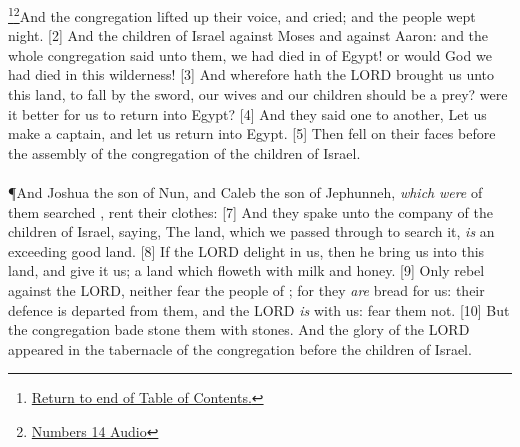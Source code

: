 \footnote{\textcolor[cmyk]{0.99998,1,0,0}{\hyperlink{TOC}{Return to end of Table of Contents.}}}\footnote{\href{https://audiobible.com/bible/numbers_14.html}{\textcolor[cmyk]{0.99998,1,0,0}{Numbers 14 Audio}}}\textcolor[cmyk]{0.99998,1,0,0}{And  the congregation lifted up their voice, and cried; and the people wept   night.}
[2] \textcolor[cmyk]{0.99998,1,0,0}{And  the children of Israel  against Moses and against Aaron: and the whole congregation said unto them,    we had died in  of Egypt! or would God we had died in this wilderness!}
[3] \textcolor[cmyk]{0.99998,1,0,0}{And wherefore hath the LORD brought us unto this land, to fall by the sword,   our wives and our children should be a prey? were it  better for us to return into Egypt?}
[4] \textcolor[cmyk]{0.99998,1,0,0}{And they said one to another, Let us make a captain, and let us return into Egypt.}
[5] \textcolor[cmyk]{0.99998,1,0,0}{Then  fell on their faces before  the assembly of the congregation of the children of Israel.}\\
\\
\P \textcolor[cmyk]{0.99998,1,0,0}{And Joshua the son of Nun, and Caleb the son of Jephunneh, \emph{which} \emph{were} of them   searched , rent their clothes:}
[7] \textcolor[cmyk]{0.99998,1,0,0}{And they spake unto  the company of the children of Israel, saying, The land, which we passed through to search it, \emph{is} an exceeding good land.}
[8] \textcolor[cmyk]{0.99998,1,0,0}{If the LORD delight in us, then he  bring us into this land, and give it us; a land which floweth with milk and honey.}
[9] \textcolor[cmyk]{0.99998,1,0,0}{Only rebel   against the LORD, neither fear  the people of ; for they \emph{are} bread for us: their defence is departed from them, and the LORD \emph{is} with us: fear them not.}
[10] \textcolor[cmyk]{0.99998,1,0,0}{But  the congregation bade stone them with stones. And the glory of the LORD appeared in the tabernacle of the congregation before  the children of Israel.}\\
